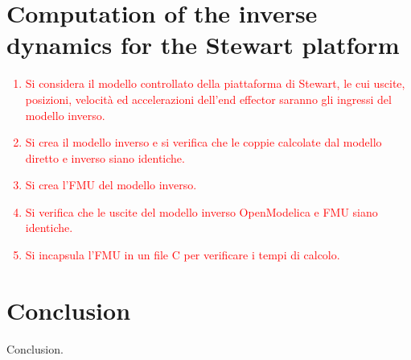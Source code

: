 \documentclass[]{interact}
\theoremstyle{plain}%
\theoremstyle{definition}
\theoremstyle{remark}
\begin{document}

\section{Computation of the inverse dynamics for the Stewart platform}
\label{Sec:Inverse_dynamics}

\textcolor{red}{
\begin{enumerate}
 \item Si considera il modello controllato della piattaforma di Stewart, le cui uscite, posizioni, velocità ed accelerazioni dell'end effector saranno gli ingressi del modello inverso.
  \item Si crea il modello inverso e si verifica che le coppie calcolate dal modello diretto e inverso siano identiche.
  \item Si crea l'FMU del modello inverso.
  \item Si verifica che le uscite del modello inverso OpenModelica e FMU siano identiche.
  \item Si incapsula l’FMU in un file C per verificare i tempi di calcolo.
\end{enumerate}
}

\section{Conclusion}
\label{Sec:Conclusion}

Conclusion.




%
%
\end{document}
